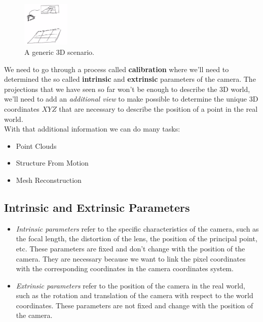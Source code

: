 \begin{figure}[h!]
    \centering
    \includegraphics[width=0.2\textwidth]{Figures/3d.png}
    \caption{A generic 3D scenario.}
    \label{fig:3d}
\end{figure}

We need to go through a process called \textbf{calibration} where we'll need to determined the so called \textbf{intrinsic} and \textbf{extrinsic} parameters of the camera. The projections that we have seen so far won't be enough to describe the 3D world, we'll need to add an \textit{additional view} to make possible to determine the unique 3D coordinates \(X Y Z\) that are necessary to describe the position of a point in the real world. 
\\With that additional information we can do many tasks:
\begin{itemize} 
    \item Point Clouds
    \item Structure From Motion
    \item Mesh Reconstruction
\end{itemize}

\subsection{Intrinsic and Extrinsic Parameters}

\begin{itemize} 
    \item\textit{Intrinsic parameters} refer to the specific characteristics of the camera, such as the focal length, the distortion of the lens, the position of the principal point, etc. These parameters are fixed and don't change with the position of the camera. They are necessary because we want to link the pixel coordinates with the corresponding coordinates in the camera coordinates system.

    \item\textit{Extrinsic parameters} refer to the position of the camera in the real world, such as the rotation and translation of the camera with respect to the world coordinates. These parameters are not fixed and change with the position of the camera.
\end{itemize}

